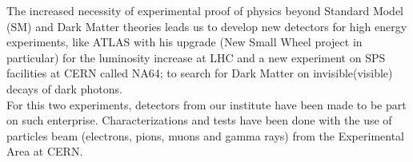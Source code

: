 	The increased necessity of experimental proof of physics beyond Standard Model (SM) and Dark Matter theories leads us
	to develop new detectors for high energy experiments, like ATLAS with his upgrade (New Small Wheel project in
	particular) for the luminosity increase at LHC and a new experiment on SPS facilities at CERN called NA64; to search
	for Dark Matter on invisible(visible) decays of dark photons.\\ 
	For this two experiments, detectors from our institute have been made to be part on such enterprise.  Characterizations and tests have been done with the use of particles beam (electrons, pions, muons and gamma rays) from the Experimental Area at CERN.\par


